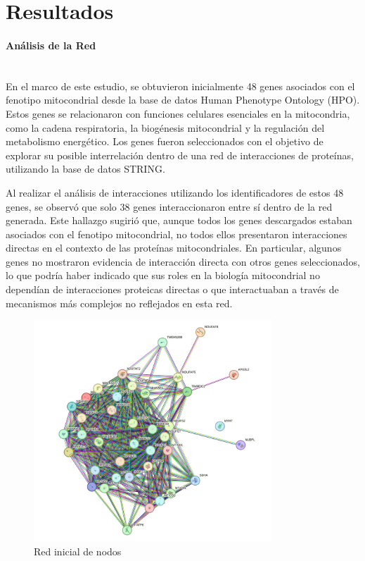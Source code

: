 
\section{Resultados}


\paragraph{Análisis de la Red} \mbox{}\\

En el marco de este estudio, se obtuvieron inicialmente 48 genes asociados con el fenotipo mitocondrial desde la base de datos Human Phenotype Ontology (HPO). Estos genes se relacionaron con funciones celulares esenciales en la mitocondria, como la cadena respiratoria, la biogénesis mitocondrial y la regulación del metabolismo energético. Los genes fueron seleccionados con el objetivo de explorar su posible interrelación dentro de una red de interacciones de proteínas, utilizando la base de datos STRING.

Al realizar el análisis de interacciones utilizando los identificadores de estos 48 genes, se observó que solo 38 genes interaccionaron entre sí dentro de la red generada. Este hallazgo sugirió que, aunque todos los genes descargados estaban asociados con el fenotipo mitocondrial, no todos ellos presentaron interacciones directas en el contexto de las proteínas mitocondriales. En particular, algunos genes no mostraron evidencia de interacción directa con otros genes seleccionados, lo que podría haber indicado que sus roles en la biología mitocondrial no dependían de interacciones proteicas directas o que interactuaban a través de mecanismos más complejos no reflejados en esta red.

\begin{figure}
	\centering
	\includegraphics[width=0.8\textwidth]{figures/string_graph.png}
	\caption{Red inicial de nodos}
	\label{fig:imagen1}
\end{figure}

